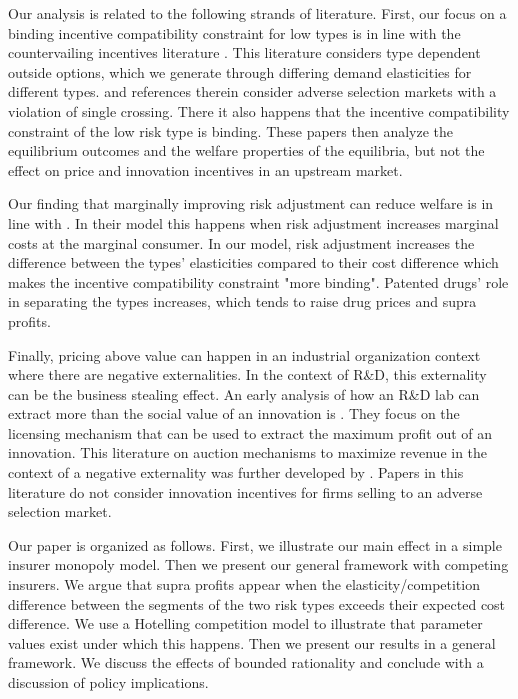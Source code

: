 \documentclass[12pt,english,a4paper]{article}
\begin{document}
Our analysis is related to the following strands of literature. First, our focus on a binding incentive compatibility constraint for low types is in line with the countervailing incentives literature \citep{LEWIS1989294}. This literature considers type dependent outside options, which we generate through differing demand elasticities for different types. \cite{BooneS13} and references therein consider adverse selection markets with a violation of single crossing. There it also happens that the incentive compatibility constraint of the low risk type is binding. These papers then analyze the equilibrium outcomes and the welfare properties of the equilibria, but not the effect on price and innovation incentives in an upstream market. 

Our finding that marginally improving risk adjustment can reduce welfare is in line with \cite{weyl2017}. In their model this happens when risk adjustment increases marginal costs at the marginal consumer. In our model, risk adjustment increases the difference between the types' elasticities  compared to their cost difference which makes the incentive compatibility constraint "more binding". Patented drugs' role in separating the types increases, which tends to raise drug prices and supra profits.

Finally, pricing above value can happen in an industrial organization context where there are negative externalities. In the context of R\&D, this externality can be the business stealing effect. An early analysis of how an R\&D lab can extract more than the social value of an innovation is \cite{KatzShapiro1986}. They focus on the licensing mechanism that can be used to extract the maximum profit out of an innovation. This literature on auction mechanisms to maximize revenue in the context of a negative externality was further developed by \cite{jehiel1996}. Papers in this literature do not consider innovation incentives for firms selling to an adverse selection market.

Our paper is organized as follows. First, we illustrate our main effect in a simple insurer monopoly model. Then we present our general framework with competing insurers. We argue that supra profits appear when the elasticity/competition difference between the segments of the two risk types exceeds their expected cost difference. We use a Hotelling competition model to illustrate that parameter values exist under which this happens. Then we present our results in a general framework. We discuss the effects of bounded rationality and conclude with a discussion of policy implications.
\end{document}
